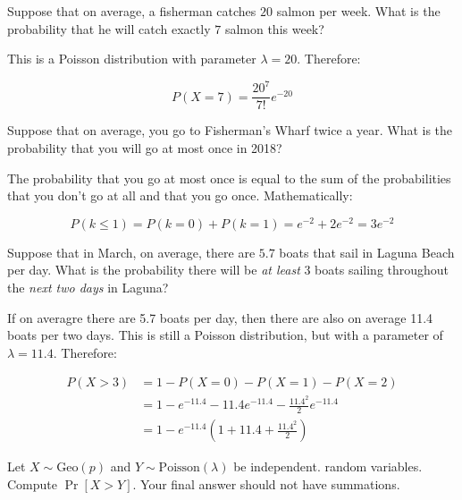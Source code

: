 \documentclass[11pt]{article}
\begin{document}
\begin{Parts}
	\Part Suppose that on average, a fisherman catches $20$ salmon per week. What is the probability that he will catch exactly $7$ salmon this week?

    \begin{solution}
        This is a Poisson distribution with parameter $\lambda = 20$. Therefore: 

        \[ P(X = 7) = \frac{20^7}{7!}e^{-20}\]
    \end{solution}
    
	
	\Part Suppose that on average, you go to Fisherman's Wharf twice a year. What is the probability that you will go at most once in 2018?

    \begin{solution}
        The probability that you go at most once is equal to the sum of the probabilities that you don't go at all and that you go once. Mathematically: 

        \[ P(k \le 1) = P(k = 0) + P(k = 1) = e^{-2} + 2e^{-2} = 3e^{-2}\] 
    \end{solution}
    

	\Part Suppose that in March, on average, there are $5.7$ boats that sail in Laguna Beach per day. What is the probability there will be \textit{at least} $3$ boats sailing throughout the \textit{next two days} in Laguna?

    \begin{solution}
        If on averagre there are 5.7 boats per day, then there are also on average 11.4 boats per two days. This is still a Poisson distribution, but with a parameter of $\lambda = 11.4$. Therefore: 

        \begin{align*}
            P(X > 3) &= 1 - P(X = 0) - P(X = 1) - P(X = 2)\\
            &= 1 - e^{-11.4} - 11.4e^{-11.4} - \frac{11.4^2}{2} e^{-11.4}\\
            &= 1 - e^{-11.4}\left(1 + 11.4 + \frac{11.4^2}{2}\right)
        \end{align*}
    \end{solution}
    
	
\end{Parts}
\pagebreak
{}

Let $X\sim \text{Geo}(p)$ and $Y\sim \text{Poisson}(\lambda)$ be independent. random variables. Compute $\Pr[X>Y]$. Your final answer should not have summations.
\end{document}
